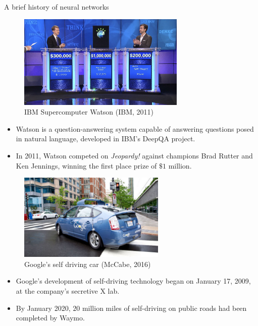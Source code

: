 \begin{vbframe}{A brief history of neural networks}
\begin{figure}
\centering
\includegraphics[width=8cm]{figure/ibmsupercomputer.jpg}
\caption{IBM Supercomputer Watson (IBM, 2011)}
\end{figure}
\footnotesize
\begin{itemize}
\item Watson is a question-answering system capable of answering questions posed in natural language, developed in IBM's DeepQA project.
\vspace{.1cm}
\item In 2011, Watson competed on \textit{Jeopardy!} against champions Brad Rutter and Ken Jennings, winning the first place prize of $\$ 1$ million.
\end{itemize}
\framebreak

\begin{figure}
\centering
\includegraphics[width=7cm]{figure/selfdriving.jpg}
\caption{Google's self driving car (McCabe, 2016)}
\end{figure}
\footnotesize
\begin{itemize}
\item Google's development of self-driving technology began on January 17, 2009, at the company's secretive X lab.
\vspace{.1cm}
\item By January 2020, $20$ million miles of self-driving on public roads had been completed by Waymo.
\end{itemize}
\framebreak


\end{vbframe}
